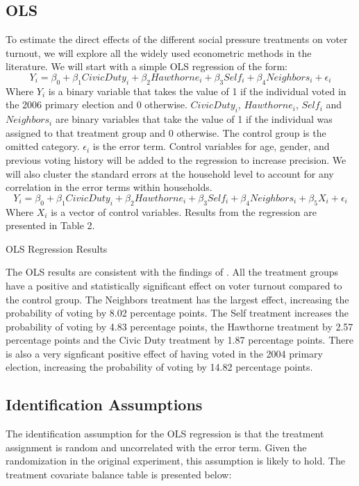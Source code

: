 \documentclass[11pt, draft]{article}
\begin{document}
\subsection{OLS}
To estimate the direct effects of the different social pressure treatments on voter turnout, we will explore all the widely used econometric methods in the literature. We will start with a simple OLS regression of the form:
\begin{equation}
    Y_i = \beta_0 + \beta_1 CivicDuty_i + \beta_2 Hawthorne_i + \beta_3 Self_i + \beta_4 Neighbors_i + \epsilon_i
\end{equation}
Where $Y_i$ is a binary variable that takes the value of 1 if the individual voted in the 2006 primary election and 0 otherwise. $CivicDuty_i$, $Hawthorne_i$, $Self_i$ and $Neighbors_i$ are binary variables that take the value of 1 if the individual was assigned to that treatment group and 0 otherwise. The control group is the omitted category. $\epsilon_i$ is the error term.
Control variables for age, gender, and previous voting history will be added to the regression to increase precision. We will also cluster the standard errors at the household level to account for any correlation in the error terms within households.
\begin{equation}
    Y_i = \beta_0 + \beta_1 CivicDuty_i + \beta_2 Hawthorne_i + \beta_3 Self_i + \beta_4 Neighbors_i + \beta_5 X_i + \epsilon_i
\end{equation}
Where $X_i$ is a vector of control variables. Results from the regression are presented in Table 2. 
\begin{table}[H]
    
    \caption{OLS Regression Results}        
\end{table}
The OLS results are consistent with the findings of \cite{gerber_social_2008}. All the treatment groups have a positive and statistically significant effect on voter turnout compared to the control group. The Neighbors treatment has the largest effect, increasing the probability of voting by 8.02 percentage points. The Self treatment increases the probability of voting by 4.83 percentage points, the Hawthorne treatment by 2.57 percentage points and the Civic Duty treatment by 1.87 percentage points. There is also a very signficant positive effect of having voted in the 2004 primary election, increasing the probability of voting by 14.82 percentage points.

\subsection{Identification Assumptions}
The identification assumption for the OLS regression is that the treatment assignment is random and uncorrelated with the error term. Given the randomization in the original experiment, this assumption is likely to hold. The treatment covariate balance table is presented below:

\end{document}
